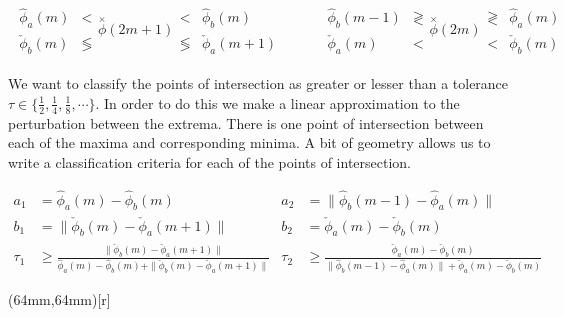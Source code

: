 \begin{align}
\begin{array}{cc}
      \hat{\phi}_{a}(m)  & <            \\
 \check{\phi}_{b}(m)  & \lessgtr   
\end{array}
\overset{\times}{\phi} (2m+1) 
\begin{array}{cc}
 <             &    \hat{\phi}_{b}(m)  \\
\lessgtr    &\check{\phi}_{a} (m+1)  
\end{array} \quad
& \quad
\begin{array}{cc}
 \hat{\phi}_{b}(m-1) &\gtrless \\
  \check{\phi}_{a} (m) & < 
\end{array}
\overset{\times}{\phi} (2m) 
\begin{array}{cc}
\gtrless &     \hat{\phi}_{a}(m)  \\
  < & \check{\phi}_{b}(m)  
\end{array} 
\end{align}

We want to classify the points of intersection as greater or lesser than a tolerance $\tau \in \{ \frac{1}{2}, \frac{1}{4},\frac{1}{8}, \cdots \}$. In order to do this we make a linear approximation to the perturbation between the extrema. There is one point of intersection between each of the maxima and corresponding minima. A bit of geometry allows us to write a classification criteria for each of the points of intersection.

\begin{align*}
a_1 & =     \hat{\phi}_{a}(m)     -      \hat{\phi}_{b}(m)  &
a_2 &=     \| \hat{\phi}_{b}(m-1) -     \hat{\phi}_{a}(m) \|  \\
b_1 &= \| \check{\phi}_{b}(m)     - \check{\phi}_{a} (m+1) \| &
b_2 &= \check{\phi}_{a}(m)     - \check{\phi}_{b}(m) \\
\tau_1 &\ge \frac{\| \check{\phi}_{b}(m)  - \check{\phi}_{a} (m+1) \| }{ \hat{\phi}_{a}(m)  - \hat{\phi}_{b}(m)+\| \check{\phi}_{b}(m)  - \check{\phi}_{a} (m+1) \| } & 
\tau_2 &\ge \frac{\check{\phi}_{a}(m)  - \check{\phi}_{b}(m) }{\| \hat{\phi}_{b}(m-1) - \hat{\phi}_{a}(m) \| +\check{\phi}_{a}(m)  - \check{\phi}_{b}(m) }
\end{align*}

\parpic(64mm,64mm)[r]{
}

